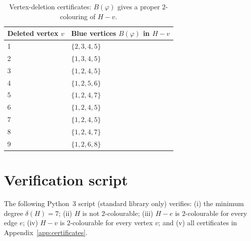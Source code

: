 \documentclass[11pt]{amsart}
\theoremstyle{definition}
\theoremstyle{remark}
\newcommand{\del}{\delta}
\begin{document}
\begin{table}[t]
\centering
\small
\begin{tabular}{@{}ll@{}}
\toprule
Deleted vertex $v$ & Blue vertices $B(\varphi)$ in $H-v$\\
\midrule
1 & $\{2,3,4,5\}$ \\
2 & $\{1,3,4,5\}$ \\
3 & $\{1,2,4,5\}$ \\
4 & $\{1,2,5,6\}$ \\
5 & $\{1,2,4,7\}$ \\
6 & $\{1,2,4,5\}$ \\
7 & $\{1,2,4,5\}$ \\
8 & $\{1,2,4,7\}$ \\
9 & $\{1,2,6,8\}$ \\
\bottomrule
\end{tabular}
\caption{Vertex-deletion certificates: $B(\varphi)$ gives a proper $2$-colouring of $H-v$.}
\label{tab:vertex-cert}
\end{table}

\section{Verification script}\label{app:verification}

The following Python~3 script (standard library only) verifies:
(i) the minimum degree $\del(H)=7$;
(ii) $H$ is not $2$-colourable;
(iii) $H-e$ is $2$-colourable for every edge $e$;
(iv) $H-v$ is $2$-colourable for every vertex $v$;
and (v) all certificates in Appendix~\ref{app:certificates}.
\end{document}
